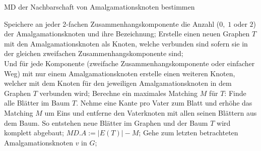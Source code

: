 \begin{algorithm}
\caption{MD der Nachbarschaft von Amalgamationsknoten bestimmen}
\begin{algorithmic}[1]
\vspace{2mm}
\ENDFOR
\STATE Speichere an jeder 2-fachen Zusammenhangskomponente die Anzahl ($0,\;1$ oder $2$) der Amalgamationsknoten und ihre Bezeichnung; 
\STATE Erstelle einen neuen Graphen $T$ mit den Amalgamationsknoten als Knoten, welche verbunden sind sofern sie in der gleichen zweifachen Zusammenhangskomponente sind;\\
\STATE Und für jede Komponente (zweifache Zusammenhangskomponente oder einfacher Weg) mit nur einem Amalgamationsknoten erstelle einen weiteren Knoten, welcher mit dem Knoten für den jeweiligen Amalgamationsknoten in dem Graphen $T$ verbunden wird;
\STATE Berechne ein maximales Matching $M$ für $T$: Finde alle Blätter im Baum $T$. Nehme eine Kante pro Vater zum Blatt und erhöhe das Matching $M$ um Eins und entferne den Vaterknoten mit allen seinen Blättern aus dem Baum. So entstehen neue Blätter im Graphen und der Baum $T$ wird komplett abgebaut;
\STATE $MD.A:=|E(T)|-M$;
\STATE Gehe zum letzten betrachteten Amalgamationsknoten $v$ in $G$;
\ENDIF
{}
\ENDFOR
\end{algorithmic}
\label{algsonderfall2}
\end{algorithm}
\clearpage
